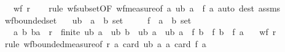 \begin{isabellebody}
\ \ \ {\isachardoublequoteopen}wf\ r{\isachardoublequoteclose}\isanewline
%
\isadelimproof
\ \ %
\endisadelimproof
%
\isatagproof
{}\isamarkupfalse%
\ {\isacharparenleft}{\kern0pt}rule\ wf{\isacharunderscore}{\kern0pt}subset{\isacharbrackleft}{\kern0pt}OF\ wf{\isacharunderscore}{\kern0pt}measure{\isacharbrackleft}{\kern0pt}of\ {\isachardoublequoteopen}{\isasymlambda}a{\isachardot}{\kern0pt}\ ub\ a\ {\isacharminus}{\kern0pt}\ f\ a{\isachardoublequoteclose}{\isacharbrackright}{\kern0pt}{\isacharbrackright}{\kern0pt}{\isacharparenright}{\kern0pt}\ {\isacharparenleft}{\kern0pt}auto\ dest{\isacharcolon}{\kern0pt}\ assms{\isacharparenright}{\kern0pt}%
\endisatagproof
{\isafoldproof}%
%
\isadelimproof
\isanewline
%
\endisadelimproof
\isanewline
{}\isamarkupfalse%
\ wf{\isacharunderscore}{\kern0pt}bounded{\isacharunderscore}{\kern0pt}set{\isacharcolon}{\kern0pt}\isanewline
\ \ \ ub\ {\isacharcolon}{\kern0pt}{\isacharcolon}{\kern0pt}\ {\isachardoublequoteopen}{\isacharprime}{\kern0pt}a\ {\isasymRightarrow}\ {\isacharprime}{\kern0pt}b\ set{\isachardoublequoteclose}\isanewline
\ \ \ \ \ f\ {\isacharcolon}{\kern0pt}{\isacharcolon}{\kern0pt}\ {\isachardoublequoteopen}{\isacharprime}{\kern0pt}a\ {\isasymRightarrow}\ {\isacharprime}{\kern0pt}b\ set{\isachardoublequoteclose}\isanewline
\ \ \ {\isachardoublequoteopen}{\isasymAnd}a\ b{\isachardot}{\kern0pt}\ {\isacharparenleft}{\kern0pt}b{\isacharcomma}{\kern0pt}a{\isacharparenright}{\kern0pt}\ {\isasymin}\ r\ {\isasymLongrightarrow}\ finite\ {\isacharparenleft}{\kern0pt}ub\ a{\isacharparenright}{\kern0pt}\ {\isasymand}\ ub\ b\ {\isasymsubseteq}\ ub\ a\ {\isasymand}\ ub\ a\ {\isasymsupseteq}\ f\ b\ {\isasymand}\ f\ b\ {\isasymsupset}\ f\ a{\isachardoublequoteclose}\isanewline
\ \ \ {\isachardoublequoteopen}wf\ r{\isachardoublequoteclose}\isanewline
%
\isadelimproof
\ \ %
\endisadelimproof
%
\isatagproof
{}\isamarkupfalse%
\ {\isacharparenleft}{\kern0pt}rule\ wf{\isacharunderscore}{\kern0pt}bounded{\isacharunderscore}{\kern0pt}measure{\isacharbrackleft}{\kern0pt}of\ r\ {\isachardoublequoteopen}{\isasymlambda}a{\isachardot}{\kern0pt}\ card\ {\isacharparenleft}{\kern0pt}ub\ a{\isacharparenright}{\kern0pt}{\isachardoublequoteclose}\ {\isachardoublequoteopen}{\isasymlambda}a{\isachardot}{\kern0pt}\ card\ {\isacharparenleft}{\kern0pt}f\ a{\isacharparenright}{\kern0pt}{\isachardoublequoteclose}{\isacharbrackright}{\kern0pt}{\isacharparenright}{\kern0pt}\isanewline
\ \ \isamarkupfalse%

\end{isabellebody}
